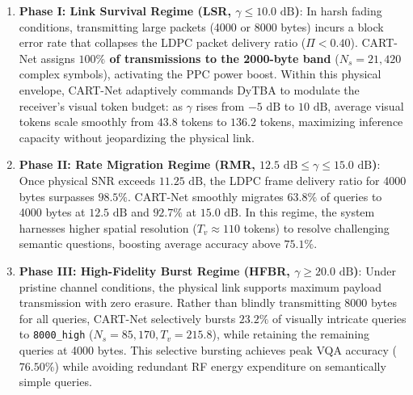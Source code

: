 \begin{enumerate}
    \item \textbf{Phase I: Link Survival Regime (LSR, $\gamma \le 10.0\text{ dB}$)}:
    In harsh fading conditions, transmitting large packets (4000 or 8000 bytes) incurs a block error rate that collapses the LDPC packet delivery ratio ($\Pi < 0.40$). CART-Net assigns \textbf{$100\%$ of transmissions to the 2000-byte band} ($N_s = 21{,}420$ complex symbols), activating the PPC power boost. Within this physical envelope, CART-Net adaptively commands DyTBA to modulate the receiver's visual token budget: as $\gamma$ rises from $-5\text{ dB}$ to $10\text{ dB}$, average visual tokens scale smoothly from $43.8$ tokens to $136.2$ tokens, maximizing inference capacity without jeopardizing the physical link.
    
    \item \textbf{Phase II: Rate Migration Regime (RMR, $12.5\text{ dB} \le \gamma \le 15.0\text{ dB}$)}:
    Once physical SNR exceeds $11.25\text{ dB}$, the LDPC frame delivery ratio for 4000 bytes surpasses $98.5\%$. CART-Net smoothly migrates $63.8\%$ of queries to 4000 bytes at $12.5\text{ dB}$ and $92.7\%$ at $15.0\text{ dB}$. In this regime, the system harnesses higher spatial resolution ($T_v \approx 110$ tokens) to resolve challenging semantic questions, boosting average accuracy above $75.1\%$.
    
    \item \textbf{Phase III: High-Fidelity Burst Regime (HFBR, $\gamma \ge 20.0\text{ dB}$)}:
    Under pristine channel conditions, the physical link supports maximum payload transmission with zero erasure. Rather than blindly transmitting 8000 bytes for all queries, CART-Net selectively bursts $23.2\%$ of visually intricate queries to \texttt{8000\_high} ($N_s = 85{,}170, T_v = 215.8$), while retaining the remaining queries at 4000 bytes. This selective bursting achieves peak VQA accuracy ($76.50\%$) while avoiding redundant RF energy expenditure on semantically simple queries.
\end{enumerate}
